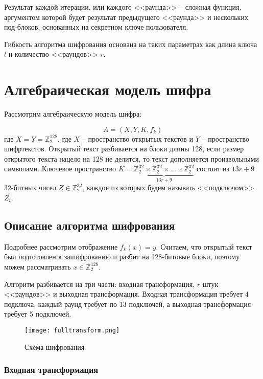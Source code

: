 \documentclass[12pt, a4paper]{article}
\begin{document}
Результат каждой итерации, или каждого <<раунда>> -- сложная функция, аргументом которой будет результат предыдущего <<раунда>> и нескольких под-блоков, основанных на секретном ключе пользователя. 

Гибкость алгоритма шифрования основана на таких параметрах как длина ключа $l$ и количество <<раундов>> $r$.

\section{Алгебраическая модель шифра}

Рассмотрим алгебраическую модель шифра:

\begin{equation}
A = \left(X, Y, K, f_k \right)
\end{equation}
где $X = Y = \mathds{Z}_2^{128}$, где $X$ -- пространство открытых текстов и $Y$ -- пространство шифртекстов. Открытый текст разбивается на блоки длины 128, если размер открытого текста нацело на 128 не делится, то текст дополняется произвольными символами. Ключевое пространство $K = \underbrace{\mathds{Z}_2^{32} \times \mathds{Z}_2^{32} \times ... \times \mathds{Z}_2^{32}}_{13r + 9}$ состоит из $13r + 9$ 32-битных чисел $Z \in \mathds{Z}_2^{32}$, каждое из которых будем называть <<подключом>> $Z_i$.

\subsection{Описание алгоритма шифрования}

Подробнее рассмотрим отображение $f_k(x) = y$. Считаем, что открытый текст был подготовлен к зашифрованию и разбит на 128-битовые блоки, поэтому можем рассматривать $x \in \mathds{Z}_2^{128}$.

Алгоритм разбивается на три части: входная трансформация, $r$ штук <<раундов>> и выходная трансформация.  Входная трансформация требует 4 подключа, каждый раунд требует по 13 подключей, а выходная трансформация требует 5 подключей.

\begin{figure}[h] 
\centering
\texttt{[image: fulltransform.png]}
\caption{Схема шифрования}
\label{pic:2} 
\end{figure}

\subsubsection{Входная трансформация}
\end{document}
